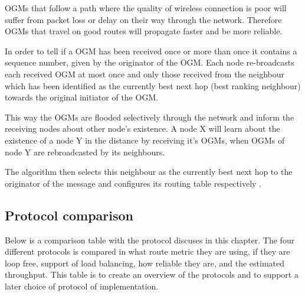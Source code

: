 OGMs that follow a path where the quality of wireless connection is poor will suffer from packet loss or delay on their way through the network.
Therefore OGMs that travel on good routes will propagate faster and be more reliable\cite{BATMAN}.

In order to tell if a OGM has been received once or more than once it contains a sequence number, given by the originator of the OGM.
Each node re-broadcasts each received OGM at most once and only those received from the neighbour which has been identified as the currently best next hop (best ranking neighbour) towards the original initiator of the OGM.

This way the OGMs are flooded selectively through the network and inform the receiving nodes about other node's existence. 
A node X will learn about the existence of a node Y in the distance by receiving it's OGMs, when OGMs of node Y are rebroadcasted by its neighbours.

The algorithm then selects this neighbour as the currently best next hop to the originator of the message and configures its routing table respectively \cite{BATMAN}.

\subsection{Protocol comparison}
Below is a comparison table with the protocol discuses in this chapter.
The four different protocols is compared in what route metric they are using, if they are loop free, support of load balancing, how reliable they are, and the estimated throughput.
This table is to create an overview of the protocols and to support a later choice of protocol of implementation.

